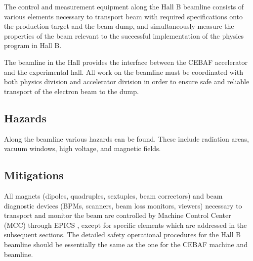 


The control and measurement equipment along the Hall B beamline consists of various elements necessary to transport beam with required specifications onto the production target and the beam dump, and simultaneously measure the properties of the beam relevant to the successful implementation of the physics program in Hall B. 

The beamline in the Hall provides the interface between the CEBAF accelerator and the experimental hall. All work on the beamline must be coordinated with both physics division and accelerator division in order to ensure safe and reliable transport of the electron beam to the dump.

\subsection{Hazards} 

Along the beamline various hazards can be found. These include radiation areas, vacuum windows, high voltage, and magnetic fields.

\subsection{Mitigations}

\indent

All magnets (dipoles, quadruples, sextuples, beam correctors) and beam diagnostic devices (BPMs, scanners, beam loss monitors, viewers) necessary to transport and monitor the beam are controlled by Machine Control Center (MCC) through EPICS \cite{EPICSwww}, except for specific elements which are addressed in the subsequent sections. The detailed safety operational procedures for the Hall B beamline should be essentially the same as the one for the CEBAF machine and beamline.

